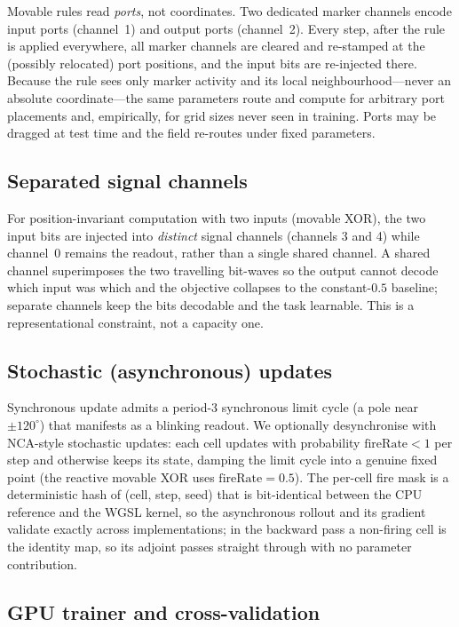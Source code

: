Movable rules read \emph{ports}, not coordinates. Two dedicated marker channels encode input ports (channel~1) and output ports (channel~2). Every step, after the rule is applied everywhere, all marker channels are cleared and re-stamped at the (possibly relocated) port positions, and the input bits are re-injected there. Because the rule sees only marker activity and its local neighbourhood---never an absolute coordinate---the same parameters route and compute for arbitrary port placements and, empirically, for grid sizes never seen in training. Ports may be dragged at test time and the field re-routes under fixed parameters.

\subsection*{Separated signal channels}

For position-invariant computation with two inputs (movable XOR), the two input bits are injected into \emph{distinct} signal channels (channels 3 and 4) while channel~0 remains the readout, rather than a single shared channel. A shared channel superimposes the two travelling bit-waves so the output cannot decode which input was which and the objective collapses to the constant-$0.5$ baseline; separate channels keep the bits decodable and the task learnable. This is a representational constraint, not a capacity one.

\subsection*{Stochastic (asynchronous) updates}

Synchronous update admits a period-3 synchronous limit cycle (a pole near $\pm120^\circ$) that manifests as a blinking readout. We optionally desynchronise with NCA-style stochastic updates: each cell updates with probability $\mathrm{fireRate}<1$ per step and otherwise keeps its state, damping the limit cycle into a genuine fixed point (the reactive movable XOR uses $\mathrm{fireRate}=0.5$). The per-cell fire mask is a deterministic hash of (cell, step, seed) that is bit-identical between the CPU reference and the WGSL kernel, so the asynchronous rollout and its gradient validate exactly across implementations; in the backward pass a non-firing cell is the identity map, so its adjoint passes straight through with no parameter contribution.

\subsection*{GPU trainer and cross-validation}


